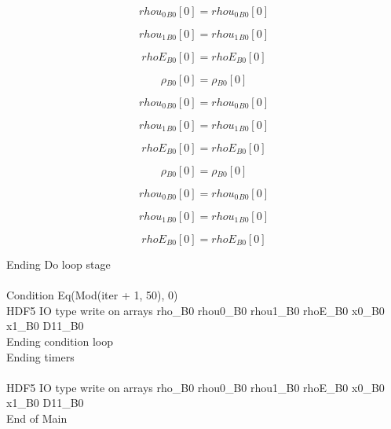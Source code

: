 \documentclass{article}
\begin{document}
\begin{dmath}{rhou_{0}{_{B0}}}[{0}] = {rhou_{0}{_{B0}}}[{0}]\end{dmath}

\begin{dmath}{rhou_{1}{_{B0}}}[{0}] = {rhou_{1}{_{B0}}}[{0}]\end{dmath}

\begin{dmath}{rhoE{_{B0}}}[{0}] = {rhoE{_{B0}}}[{0}]\end{dmath}

\begin{dmath}{\rho{_{B0}}}[{0}] = {\rho{_{B0}}}[{0}]\end{dmath}

\begin{dmath}{rhou_{0}{_{B0}}}[{0}] = {rhou_{0}{_{B0}}}[{0}]\end{dmath}

\begin{dmath}{rhou_{1}{_{B0}}}[{0}] = {rhou_{1}{_{B0}}}[{0}]\end{dmath}

\begin{dmath}{rhoE{_{B0}}}[{0}] = {rhoE{_{B0}}}[{0}]\end{dmath}

\begin{dmath}{\rho{_{B0}}}[{0}] = {\rho{_{B0}}}[{0}]\end{dmath}

\begin{dmath}{rhou_{0}{_{B0}}}[{0}] = {rhou_{0}{_{B0}}}[{0}]\end{dmath}

\begin{dmath}{rhou_{1}{_{B0}}}[{0}] = {rhou_{1}{_{B0}}}[{0}]\end{dmath}

\begin{dmath}{rhoE{_{B0}}}[{0}] = {rhoE{_{B0}}}[{0}]\end{dmath}

\noindent Ending Do loop stage\\
\\\noindent Condition Eq(Mod(iter + 1, 50), 0)\\\noindent HDF5 IO type write on arrays rho_B0 rhou0_B0 rhou1_B0 rhoE_B0 x0_B0 x1_B0 D11_B0\\\noindent Ending condition loop %
\\\noindent Ending timers\\
\\\noindent HDF5 IO type write on arrays rho_B0 rhou0_B0 rhou1_B0 rhoE_B0 x0_B0 x1_B0 D11_B0\\\noindent End of Main\\
\end{document}

